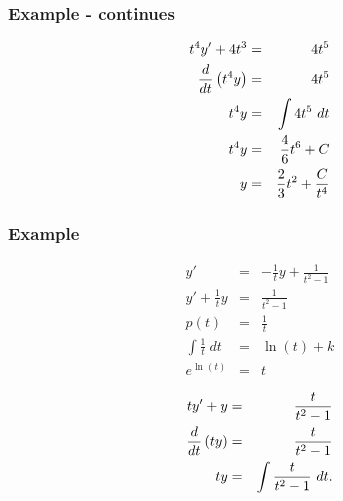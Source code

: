 \begin{frame}
  \frametitle{Example - continues}

  \begin{eqnarray*}
    t^4 y' + 4t^3& = & 4 t^5 \\
    \frac{d}{dt} \left( t^4 y \right) & = & 4 t^5 \\
    t^4 y & = & \int 4 t^5 ~ dt \\
    t^4 y & = & \frac{4}{6} t^6 + C \\
    y & = & \frac{2}{3} t^2 + \frac{C}{t^4}
  \end{eqnarray*}

\end{frame}



\begin{frame}
  \frametitle{Example}

  \vspace*{-3em}
  \begin{eqnarray*}
    y' & = & -\frac{1}{t} y + \frac{1}{t^2 -1} \\
    y' + \frac{1}{t} y & = & \frac{1}{t^2 -1} \\
    p(t) & = & \frac{1}{t} \\
    \int \frac{1}{t} ~ dt & = & \ln(t) + k \\
    e^{\ln(t)} & = & t
  \end{eqnarray*}

  \begin{eqnarray*}
    t y' + y & = & \frac{t}{t^2-1} \\
    \frac{d}{dt} \left( t y \right) & = & \frac{t}{t^2-1} \\
    t y & = & \int \frac{t}{t^2-1} ~ dt.
  \end{eqnarray*}

\end{frame}



